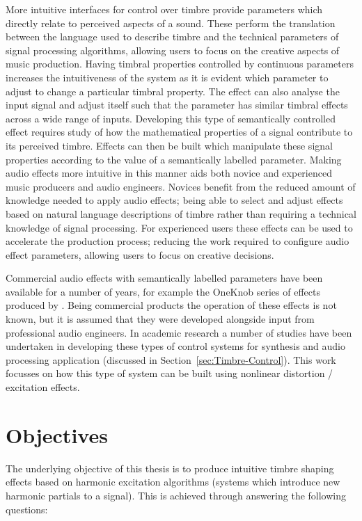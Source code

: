 	More intuitive interfaces for control over timbre provide parameters which directly relate to perceived aspects of a
	sound. These perform the translation between the language used to describe timbre and the technical parameters of
	signal processing algorithms, allowing users to focus on the creative aspects of music production. Having timbral
	properties controlled by continuous parameters increases the intuitiveness of the system as it is evident which
	parameter to adjust to change a particular timbral property. The effect can also analyse the input signal and adjust
	itself such that the parameter has similar timbral effects across a wide range of inputs. Developing this type of
	semantically controlled effect requires study of how the mathematical properties of a signal contribute to its
	perceived timbre. Effects can then be built which manipulate these signal properties according to the value of a
	semantically labelled parameter. Making audio effects more intuitive in this manner aids both novice and experienced
	music producers and audio engineers. Novices benefit from the reduced amount of knowledge needed to apply audio
	effects; being able to select and adjust effects based on natural language descriptions of timbre rather than
	requiring a technical knowledge of signal processing. For experienced users these effects can be used to accelerate
	the production process; reducing the work required to configure audio effect parameters, allowing users to focus on
	creative decisions. 
	
	Commercial audio effects with semantically labelled parameters have been available for a number of years, for
	example the OneKnob series of effects produced by \citet{wavesoneknob}. Being commercial products the operation of
	these effects is not known, but it is assumed that they were developed alongside input from professional audio
	engineers. In academic research a number of studies have been undertaken in developing these types of control
	systems for synthesis and audio processing application (discussed in Section~\ref{sec:Timbre-Control}). This work
	focusses on how this type of system can be built using nonlinear distortion / excitation effects.

\section{Objectives}
\label{sec:Introduction-Objectives}
	The underlying objective of this thesis is to produce intuitive timbre shaping effects based on harmonic excitation
	algorithms (systems which introduce new harmonic partials to a signal). This is achieved through answering the
	following questions:


